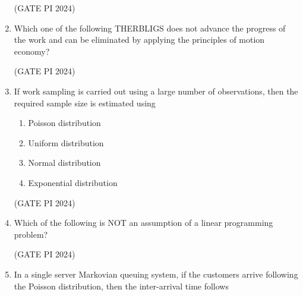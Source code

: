 \documentclass[journal,12pt,onecolumn]{IEEEtran}
\theoremstyle{remark}
\begin{document}
\begin{enumerate}
\hfill (GATE PI 2024)

\item Which one of the following THERBLIGS does not advance the progress of the work and can be eliminated by applying the principles of motion economy?

\begin{enumerate}
\end{enumerate}

\hfill (GATE PI 2024)

\item If work sampling is carried out using a large number of observations, then the required sample size is estimated using

\begin{multicols}{2}
\begin{enumerate}
    \item Poisson distribution
    \item Uniform distribution
    \item Normal distribution
    \item Exponential distribution
\end{enumerate}
\end{multicols}

\hfill (GATE PI 2024)

\item Which of the following is NOT an assumption of a linear programming problem?

\begin{enumerate}
\end{enumerate}

\hfill (GATE PI 2024)

\item In a single server Markovian queuing system, if the customers arrive following the Poisson distribution, then the inter-arrival time follows


\end{enumerate}
\end{document}
